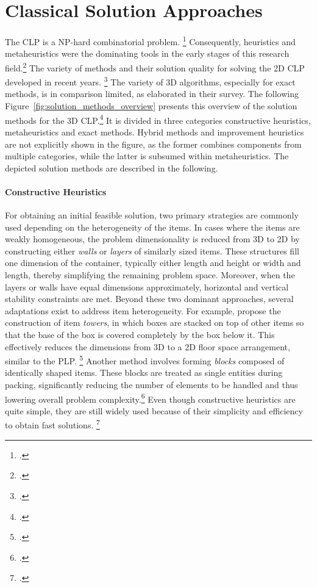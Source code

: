 \chapter{Classical Solution Approaches}
\label{sec:classical_solution_approaches}
The \gls{CLP} is a NP-hard combinatorial problem. \footcite[cf.][p. 11]{bortfeldt_constraints_2013}
Consequently, heuristics and metaheuristics were the dominating tools
in the early stages of this research field.\footcite[cf.][]{pisinger_heuristics_2002} The variety of methods
and their solution quality for solving the 2D \gls{CLP} developed in recent years. \footcite[cf.][p. 23]{iori_exact_2021}
The variety of 3D algorithms, especially for exact methods, is in comparison limited, as
\textcite{zhao_comparative_2016} elaborated in their survey. The following Figure~\ref{fig:solution_methods_overview}
presents this overview of the solution methods for the 3D \gls{CLP}.\footcite[cf.][]{zhao_comparative_2016}
It is divided in three categories constructive heuristics, metaheuristics
and exact methods. Hybrid methods and improvement heuristics are not explicitly shown in the figure,
as the former combines components from multiple categories, while the latter is subsumed within
metaheuristics. The depicted solution methods are described in the following.



\subsubsection{Constructive Heuristics}
For obtaining an initial feasible solution, two primary strategies are commonly
used depending on the heterogeneity of the items. In cases where the items are weakly homogeneous,
the problem dimensionality is reduced from 3D to 2D by constructing either
\textit{walls} or \textit{layers} of similarly sized items. These structures fill one
dimension of the container, typically either length and height or width and length, thereby
simplifying the remaining problem space. Moreover, when the layers or walls have
equal dimensions approximately, horizontal and vertical stability constraints are met.
Beyond these two dominant approaches, several adaptations exist to address item heterogeneity.
For example, \textcite{gehring_genetic_1997} propose the construction of item
\textit{towers}, in which boxes are stacked on top of other items so that the base of the box is covered completely
by the box below it.
This effectively reduces the dimensions from 3D to a 2D floor space arrangement,
similar to the \gls{PLP}. \footcite[cf.][pp. 402--406]{gehring_genetic_1997}
Another method involves forming \textit{blocks} composed of identically shaped items.
These blocks are treated as single entities
during packing, significantly reducing the number of elements to be handled and thus
lowering overall problem complexity.\footcite[cf.][p. 801]{liu_novel_2011} Even though constructive heuristics are quite simple,
they are still widely used because of their simplicity and efficiency to obtain fast solutions.
\footcite[cf.][pp. 11--13]{tamke_branch-and-cut_2024}

